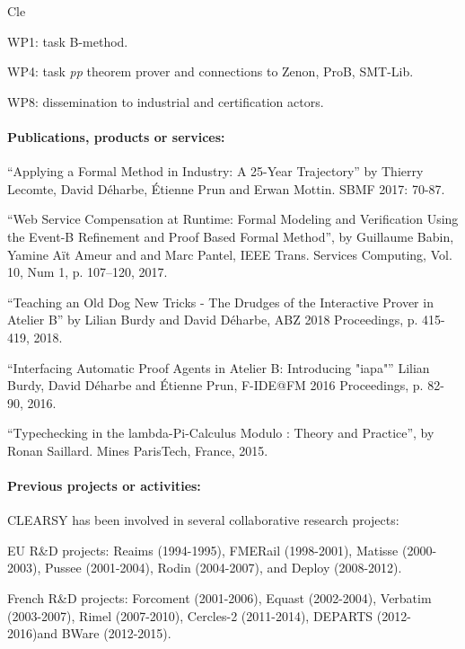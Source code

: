 \begin{sitedescription}{Cle}
\begin{compactitem}
\item WP1: task B-method.
\item WP4: task \emph{pp} theorem prover and connections to Zenon, ProB, SMT-Lib.
\item WP8: dissemination to industrial and certification actors.
\end{compactitem}


\paragraph*{Publications, products or services:}

\begin{compactitem}
\item ``Applying a Formal Method in Industry: A 25-Year Trajectory'' by Thierry Lecomte, David Déharbe, Étienne Prun and Erwan Mottin.
SBMF 2017: 70-87.
\item ``Web Service Compensation at Runtime: Formal Modeling and Verification Using the Event-B Refinement and Proof Based Formal Method'', by Guillaume Babin, Yamine Aït Ameur and and Marc Pantel, IEEE Trans. Services Computing, Vol. 10, Num 1, p. 107--120, 2017.
\item ``Teaching an Old Dog New Tricks - The Drudges of the Interactive Prover in Atelier B'' by Lilian Burdy and David Déharbe, ABZ 2018 Proceedings, p. 415-419, 2018.
\item ``Interfacing Automatic Proof Agents in Atelier B: Introducing "iapa"'' Lilian Burdy, David Déharbe and Étienne Prun, F-IDE@FM 2016 Proceedings, p. 82-90, 2016.
\item ``Typechecking in the lambda-Pi-Calculus Modulo : Theory and Practice'', by Ronan Saillard. Mines ParisTech, France, 2015.
\end{compactitem}

\paragraph*{Previous projects or activities:}

CLEARSY has been involved in several collaborative research projects:
\begin{compactitem}
\item EU R\&D projects: Reaims (1994-1995), FMERail (1998-2001), Matisse (2000-2003), Pussee (2001-2004), Rodin (2004-2007), and Deploy (2008-2012).
\item French R\&D projects: Forcoment (2001-2006), Equast (2002-2004), Verbatim (2003-2007), Rimel (2007-2010), Cercles-2 (2011-2014), DEPARTS (2012-2016)and BWare (2012-2015).
\end{compactitem}


\end{sitedescription}
